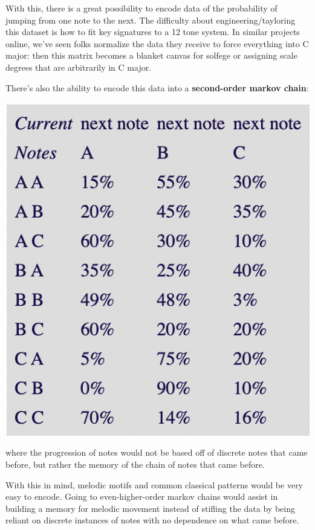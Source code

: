 \documentclass{article}
\begin{document}
With this, there is a great possibility to encode data of the probability of jumping from one note to the next. The difficulty about engineering/tayloring this dataset is how to fit key signatures to a 12 tone system. In similar projects online, we've seen folks normalize the data they receive to force everything into C major: then this matrix becomes a blanket canvas for solfege or assigning scale degrees that are arbitrarily in C major.

There's also the ability to encode this data into a \textbf{second-order markov chain}:

\begin{center}
    \includegraphics[scale=0.5]{Screen Shot 2022-12-02 at 11.01.07 AM.png}
\end{center}

where the progression of notes would not be based off of discrete notes that came before, but rather the memory of the chain of notes that came before.

With this in mind, melodic motifs and common classical patterns would be very easy to encode. Going to even-higher-order markov chains would assist in building a memory for melodic movement instead of stifling the data by being reliant on discrete instances of notes with no dependence on what came before.
\end{document}

